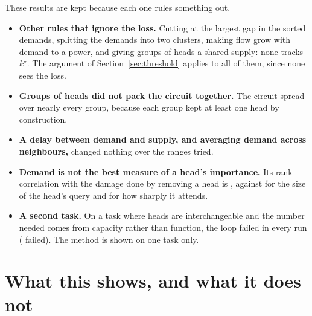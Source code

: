 \documentclass[11pt]{report}
\newcommand{\kstar}{k^\star}
\begin{document}
These results are kept because each one rules something out.
\begin{itemize}
\item \textbf{Other rules that ignore the loss.} Cutting at the largest gap in the sorted
      demands, splitting the demands into two clusters, making flow grow with demand to a
      power, and giving groups of heads a shared supply: none tracks $\kstar$. The
      argument of Section~\ref{sec:threshold} applies to all of them, since none sees the
      loss.
\item \textbf{Groups of heads did not pack the circuit together.} The circuit spread over
      nearly every group, because each group kept at least one head by construction.
\item \textbf{A delay between demand and supply, and averaging demand across neighbours,}
      changed nothing over the ranges tried.
\item \textbf{Demand is not the best measure of a head's importance.} Its rank correlation
      with the damage done by removing a head is \thRhoDemand{}, against \thRhoQnorm{} for
      the size of the head's query and \thRhoEntropy{} for how sharply it attends.
\item \textbf{A second task.} On a task where heads are interchangeable and the number
      needed comes from capacity rather than function, the loop failed in every run
      (\thQsaBad{} failed). The method is shown on one task only.
\end{itemize}

\section{What this shows, and what it does not}
\label{sec:claims}
\end{document}
